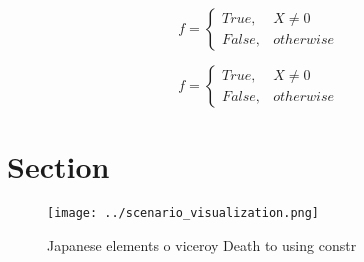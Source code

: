 \documentclass[a4paper]{article}
\begin{document}
\begin{equation}   f =
\begin{cases} True, & X \neq 0\\
False, & otherwise
\end{cases}
\end{equation}

\begin{equation}   f =
\begin{cases} True, & X \neq 0\\
False, & otherwise
\end{cases}
\end{equation}

\section{Section}

\begin{figure}
\centering
\texttt{[image: ../scenario\_visualization.png]}
\caption{Japanese elements o viceroy Death to using constr
}
\end{figure}
 
\end{document}
